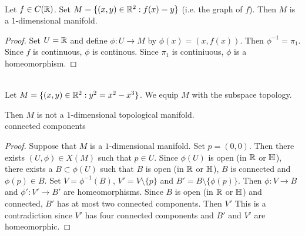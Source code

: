 \documentclass{book}
\begin{document}
	\begin{ex}   \\
		Let $f \in C(\mathbb{R})$. Set $M = \{(x,y) \in \mathbb{R}^2: f(x) = y\}$ (i.e. the graph of $f$). Then $M$ is a $1$-dimensional manifold.  
	\end{ex}
	
	\begin{proof}
		Set $U = \mathbb{R}$ and define $\phi: U \rightarrow M$ by $\phi(x) = (x, f(x))$. Then $\phi^{-1} = \pi_1$. Since $f$ is continuous, $\phi$ is continous. Since $\pi_1$ is continiuous, $\phi$ is a homeomorphism.  
	\end{proof}
	
	\begin{ex}  \\
		Let $M = \{(x,y) \in \mathbb{R}^2: y^2 = x^2 - x^3\}$. We equip $M$ with the subspace topology.
		\begin{center}
		\end{center}
		Then $M$ is not a $1$-dimensional topological manifold.\\
		 connected components
	\end{ex}
	
	\begin{proof}
		Suppose that $M$ is a $1$-dimensional manifold. Set $p = (0,0)$. Then there exists $(U, \phi) \in X(M)$ such that $p \in U$. Since $\phi(U)$ is open (in $\mathbb{R}$ or $\mathbb{H}$), there exists a $B \subset \phi(U)$ such that $B$ is open (in $\mathbb{R}$ or $\mathbb{H}$), $B$ is connected and $\phi(p) \in B$. Set $V = \phi^{-1}(B)$, $V' = V \setminus \{p\}$ and $B' = B \setminus \{\phi(p)\}$. Then $\phi: V \rightarrow B$ and $\phi': V' \rightarrow B'$ are homeomorphisms. Since $B$ is open (in $\mathbb{R}$ or $\mathbb{H}$) and connected, $B'$ has at most two connected components. Then $V'$ This is a contradiction since $V'$ has four connected components and $B'$ and $V'$ are homeomorphic. 
	\end{proof}
	
	
	
\end{document}
